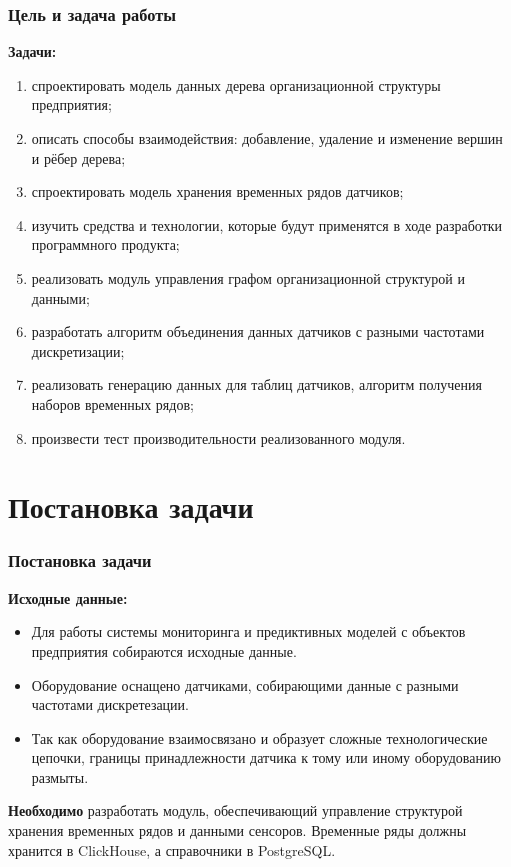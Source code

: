 \documentclass[pdf, hyperref={unicode}, aspectratio=169]{beamer}
\begin{document}
\begin{frame}
	\frametitle{Цель и задача работы}
	
	\textbf{Задачи:}
	\begin{enumerate}
		\fontsize{10pt}{12pt}\selectfont
		\item спроектировать модель данных дерева организационной структуры предприятия;
		\item описать способы взаимодействия: добавление, удаление и изменение вершин и рёбер дерева;
		\item спроектировать модель хранения временных рядов датчиков;
		\item изучить средства и технологии, которые будут применятся в ходе разработки программного продукта;
		\item реализовать модуль управления графом организационной структурой и данными;
		\item разработать алгоритм объединения данных датчиков с разными частотами дискретизации;
		\item реализовать генерацию данных для таблиц датчиков, алгоритм получения наборов временных рядов;
		\item произвести тест производительности реализованного модуля.
	\end{enumerate}
\end{frame}


\section{Постановка задачи}
\begin{frame}
	\frametitle{Постановка задачи}
	
	\textbf{Исходные данные:}
	\begin{itemize}
		\item Для работы системы мониторинга и предиктивных моделей с объектов предприятия собираются исходные данные.
		\item Оборудование оснащено датчиками, собирающими данные с разными частотами дискретезации.
		\item Так как оборудование взаимосвязано и образует сложные технологические цепочки, границы принадлежности датчика к тому или иному оборудованию размыты.
	\end{itemize}
	
	\textbf{Необходимо} разработать модуль, обеспечивающий управление структурой хранения временных рядов и данными сенсоров. Временные ряды должны хранится в ClickHouse, а справочники в PostgreSQL.
\end{frame}
\end{document}

